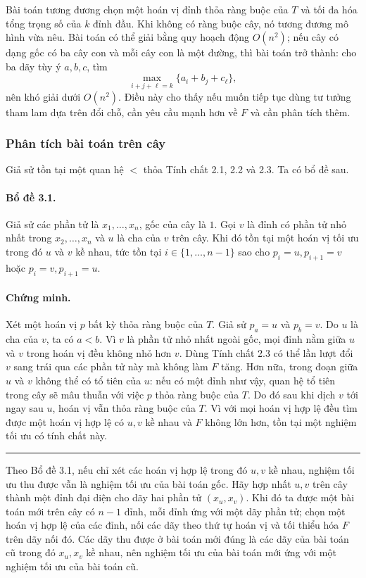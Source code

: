 \documentclass[11pt]{article}
\begin{document}
Bài toán tương đương chọn một hoán vị đỉnh thỏa ràng buộc của $T$ và tối đa hóa
tổng trọng số của $k$ đỉnh đầu. Khi không có ràng buộc cây, nó tương đương mô
hình vừa nêu. Bài toán có thể giải bằng quy hoạch động $O(n^2)$; nếu cây có
dạng gốc có ba cây con và mỗi cây con là một đường, thì bài toán trở thành:
cho ba dãy tùy ý $a,b,c$, tìm
\[
  \max_{i+j+\ell=k}\{a_i+b_j+c_\ell\},
\]
nên khó giải dưới $O(n^2)$. Điều này cho thấy nếu muốn tiếp tục dùng tư tưởng
tham lam dựa trên đổi chỗ, cần yêu cầu mạnh hơn về $F$ và cần phân tích thêm.

\subsubsection{Phân tích bài toán trên cây}

Giả sử tồn tại một quan hệ $<$ thỏa Tính chất 2.1, 2.2 và 2.3. Ta có bổ đề sau.

\paragraph{Bổ đề 3.1.}
Giả sử các phần tử là $x_1,\ldots,x_n$, gốc của cây là $1$. Gọi $v$ là đỉnh có
phần tử nhỏ nhất trong $x_2,\ldots,x_n$ và $u$ là cha của $v$ trên cây. Khi đó
tồn tại một hoán vị tối ưu trong đó $u$ và $v$ kề nhau, tức tồn tại
$i\in\{1,\ldots,n-1\}$ sao cho $p_i=u,p_{i+1}=v$ hoặc $p_i=v,p_{i+1}=u$.

\paragraph{Chứng minh.}
Xét một hoán vị $p$ bất kỳ thỏa ràng buộc của $T$. Giả sử $p_a=u$ và $p_b=v$.
Do $u$ là cha của $v$, ta có $a<b$. Vì $v$ là phần tử nhỏ nhất ngoài gốc, mọi
đỉnh nằm giữa $u$ và $v$ trong hoán vị đều không nhỏ hơn $v$. Dùng Tính chất 2.3
có thể lần lượt đổi $v$ sang trái qua các phần tử này mà không làm $F$ tăng.
Hơn nữa, trong đoạn giữa $u$ và $v$ không thể có tổ tiên của $u$: nếu có một
đỉnh như vậy, quan hệ tổ tiên trong cây sẽ mâu thuẫn với việc $p$ thỏa ràng buộc
của $T$. Do đó sau khi dịch $v$ tới ngay sau $u$, hoán vị vẫn thỏa ràng buộc
của $T$. Vì với mọi hoán vị hợp lệ đều tìm được một hoán vị hợp lệ có $u,v$ kề
nhau và $F$ không lớn hơn, tồn tại một nghiệm tối ưu có tính chất này.
\hfill\rule{0.55em}{0.55em}

Theo Bổ đề 3.1, nếu chỉ xét các hoán vị hợp lệ trong đó $u,v$ kề nhau, nghiệm
tối ưu thu được vẫn là nghiệm tối ưu của bài toán gốc. Hãy hợp nhất $u,v$ trên
cây thành một đỉnh đại diện cho dãy hai phần tử $(x_u,x_v)$. Khi đó ta được một
bài toán mới trên cây có $n-1$ đỉnh, mỗi đỉnh ứng với một dãy phần tử; chọn một
hoán vị hợp lệ của các đỉnh, nối các dãy theo thứ tự hoán vị và tối thiểu hóa
$F$ trên dãy nối đó. Các dãy thu được ở bài toán mới đúng là các dãy của bài
toán cũ trong đó $x_u,x_v$ kề nhau, nên nghiệm tối ưu của bài toán mới ứng với
một nghiệm tối ưu của bài toán cũ.
\end{document}
